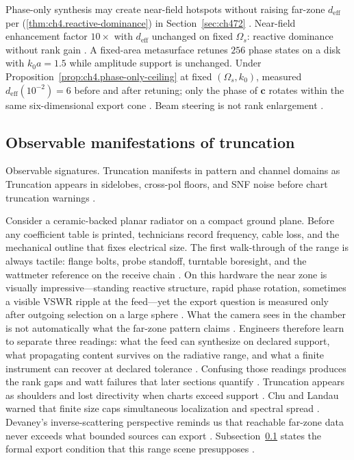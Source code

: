 Phase-only synthesis may create near-field hotspots without raising far-zone \(d_{\mathrm{eff}}\) per (\ref{thm:ch4.reactive-dominance}) in
Section~\ref{sec:ch472} \cite{stratton1941}. 
Near-field enhancement factor \(10\times\) with \(d_{\mathrm{eff}}\) unchanged on fixed \(\Omega_{s}\): reactive dominance without rank gain
\cite{stratton1941}.
A fixed-area metasurface retunes $256$ phase states on a disk with $k_{0}a=1.5$ while amplitude support is unchanged. Under Proposition~\ref{prop:ch4.phase-only-ceiling} at fixed $(\Omega_{s},k_{0})$, measured $d_{\mathrm{eff}}(10^{-2})=6$ before and after retuning; only the phase of $\mathbf{c}$ rotates within the same six-dimensional export cone \cite{stratton1941}. Beam steering is not rank enlargement \cite{jackson1999}.
\subsection{Observable manifestations of truncation}
\label{sec:ch493}
Observable signatures. Truncation manifests in pattern and channel domains as
Truncation appears in sidelobes, cross-pol floors, and SNF noise before chart truncation warnings \cite{stratton1941}.
\medskip
\begin{physicalvignette}
Consider a ceramic-backed planar radiator on a compact ground plane. Before any coefficient table is printed, technicians record frequency, cable loss, and the mechanical outline that fixes electrical size. The first walk-through of the range is always tactile: flange bolts, probe standoff, turntable boresight, and the wattmeter reference on the receive chain \cite{hansen1988}.
On this hardware the near zone is visually impressive---standing reactive structure, rapid phase rotation, sometimes a visible VSWR ripple at the feed---yet the export question is measured only after outgoing selection on a large sphere \cite{harrington2001}. What the camera sees in the chamber is not automatically what the far-zone pattern claims \cite{stratton1941}.
Engineers therefore learn to separate three readings: what the feed can synthesize on declared support, what propagating content survives on the radiative range, and what a finite instrument can recover at declared tolerance \cite{devaney2004}. Confusing those readings produces the rank gaps and watt failures that later sections quantify \cite{pal2026}.
Truncation appears as shoulders and lost directivity when charts exceed support . 
Chu and Landau warned that finite size caps simultaneous localization and spectral spread \cite{chu1948}. Devaney's inverse-scattering perspective reminds us that reachable far-zone data never exceeds what bounded sources can export \cite{devaney2004}.
Subsection~\ref{sec:ch493} states the formal export condition that this range scene presupposes \cite{stratton1941}.
\end{physicalvignette}
